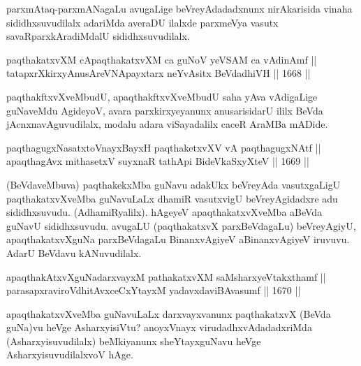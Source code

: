\begin{artha}
parxmAtaq-parxmANagaLu avugaLige beVreyAdadadxnunx nirAkarisida vinaha sididhxsuvudilalx adariMda averaDU ilalxde parxmeVya vasutx savaRparxkAradiMdalU sididhxsuvudilalx.
\end{artha}


\begin{shl}
paqthakatxvXM cApaqthakatxvXM ca guNoV yeVSAM ca vAdinAmf ||  \\
tatapxrXkirxyAnusAreVNApayxtarx neYvAsitx BeVdadhiVH \hfill || 1668 ||  
\end{shl}

\begin{artha}
paqthakftxvXveMbudU, apaqthakftxvXveMbudU saha yAva vAdigaLige guNaveMdu AgideyoV, avara parxkirxyeyanunx anusarisidarU ililx BeVda jAcnxnavAguvudilalx, modalu adara viSayadalilx caceR AraMBa mADide.
\end{artha}

\begin{shl}
paqthagugxNasatxtoV\s nayxBayxH paqthaketxvXV vA paqthagugxNAtf ||  \\
apaqthagAvx mithasetxV suyxnaR tathA\s pi BideVkaSxyXteV \hfill || 1669 ||  
\end{shl}

\begin{artha}
(BeVdaveMbuva) paqthakekxMba guNavu adakUkx beVreyAda vasutxgaLigU paqthakatxvXveMba guNavuLaLx dhamiR vasutxvigU beVreyAgidadxre adu sididhxsuvudu. (AdhamiRyalilx). hAgeyeV apaqthakatxvXveMba aBeVda guNavU sididhxsuvudu. avugaLU (paqthakatxvX parxBeVdagaLu) beVreyAgiyU, apaqthakatxvXguNa parxBeVdagaLu BinanxvAgiyeV aBinanxvAgiyeV iruvuvu. AdarU BeVdavu kANuvudilalx.
\end{artha}

\begin{shl}
apaqthakAtxvXguNadarxvayxM pathakatxvXM saMsharxyeVtakxthamf ||  \\
parasapxraviroVdhitAvxceCxYtayxM yadavxdaviBAvasumf \hfill || 1670 ||  
\end{shl}

\begin{artha}
apaqthakatxvXveMba guNavuLaLx darxvayxvanunx paqthakatxvX (BeVda guNa)vu heVge AsharxyisiVtu?  anoyxVnayx virudadhxvAdadadxriMda (Asharxyisuvudilalx) beMkiyanunx sheYtayxguNavu heVge AsharxyisuvudilalxvoV hAge.
\end{artha}

